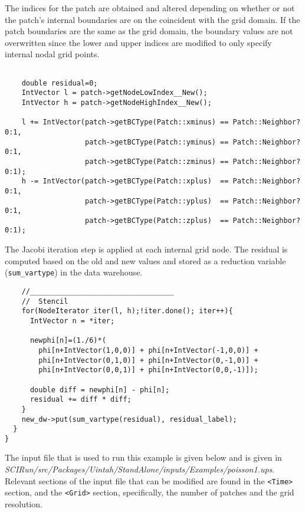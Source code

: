 \documentclass[12pt]{report}
\begin{document}
The indices for the patch are obtained and altered depending on
whether or not the patch's internal boundaries are on the coincident
with the grid domain.  If the patch boundaries are the same as the
grid domain, the boundary values are not overwritten since the lower
and upper indices are modified to only specify internal nodal grid
points.



\begin{verbatim}

    double residual=0;
    IntVector l = patch->getNodeLowIndex__New();
    IntVector h = patch->getNodeHighIndex__New();

    l += IntVector(patch->getBCType(Patch::xminus) == Patch::Neighbor?0:1,
                   patch->getBCType(Patch::yminus) == Patch::Neighbor?0:1,
                   patch->getBCType(Patch::zminus) == Patch::Neighbor?0:1);
    h -= IntVector(patch->getBCType(Patch::xplus)  == Patch::Neighbor?0:1,
                   patch->getBCType(Patch::yplus)  == Patch::Neighbor?0:1,
                   patch->getBCType(Patch::zplus)  == Patch::Neighbor?0:1);

\end{verbatim}

The Jacobi iteration step is applied at each internal grid node.  The
residual is computed based on the old and new values and stored as a
reduction variable (\texttt{sum\_vartype}) in the data warehouse.

\begin{verbatim}
    //__________________________________
    //  Stencil
    for(NodeIterator iter(l, h);!iter.done(); iter++){
      IntVector n = *iter;

      newphi[n]=(1./6)*(
        phi[n+IntVector(1,0,0)] + phi[n+IntVector(-1,0,0)] +
        phi[n+IntVector(0,1,0)] + phi[n+IntVector(0,-1,0)] +
        phi[n+IntVector(0,0,1)] + phi[n+IntVector(0,0,-1)]);

      double diff = newphi[n] - phi[n];
      residual += diff * diff;
    }
    new_dw->put(sum_vartype(residual), residual_label);
  }
}

\end{verbatim}

The input file that is used to run this example is given below and is
given in
\emph{SCIRun/src/Packages/Uintah/StandAlone/inputs/Examples/poisson1.ups}.
Relevant sections of the input file that can be modified are found in
the \texttt{<Time>} section, and the \texttt{<Grid>} section,
specifically, the number of patches and the grid resolution.
\end{document}
